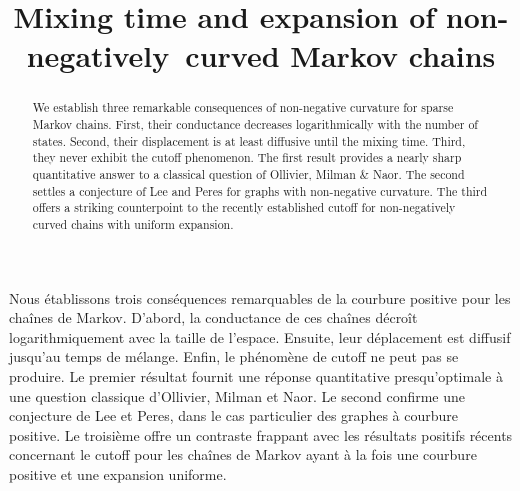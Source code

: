 \documentclass[JEP,XML,SOM,Unicode,NoEqCountersInSection,published]{cedram}
\theoremstyle{definition}
\begin{document}
\title{Mixing time and expansion of non-negatively~curved Markov chains}

\author[\initial{F.} \lastname{Münch}]{ }
\address{Max-Planck-Institut für Mathematik in den Naturwissenschaften\\
Inselstr. 22, 04103 Leipzig, Germany}

\author[\initial{J.} \lastname{Salez}]{ }
\address{Université Paris-Dauphine \& PSL, CEREMADE\\
Place du Maréchal de Lattre de Tassigny, F-75775 Paris Cedex 16, France}

\begin{abstract}
We establish three remarkable consequences of non-negative curvature for sparse Markov chains. First, their conductance decreases logarithmically with the number of states. Second, their displacement is at least diffusive until the mixing time. Third, they never exhibit the cutoff phenomenon. The first result provides a nearly sharp quantitative answer to a classical question of Ollivier, Milman \& Naor. The second settles a conjecture of Lee and Peres for graphs with non-negative curvature. The third offers a striking counterpoint to the recently established cutoff for non-negatively curved chains with uniform expansion.
\end{abstract}





\begin{altabstract}
Nous établissons trois conséquences remarquables de la courbure positive pour les chaînes de Markov. D'abord, la conductance de ces chaînes décroît logarithmiquement avec la taille de l'espace. Ensuite, leur déplacement est diffusif jusqu'au temps de mélange. Enfin, le phénomène de cutoff ne peut pas se produire. Le premier résultat fournit une réponse quantitative presqu'optimale à une question classique d'Ollivier, Milman et Naor. Le second confirme une conjecture de Lee et Peres, dans le cas particulier des graphes à courbure positive. Le troisième offre un contraste frappant avec les résultats positifs récents concernant le cutoff pour les chaînes de Markov ayant à la fois une courbure positive et une expansion uniforme.
\end{altabstract}
\maketitle
\vspace*{-\baselineskip}
\tableofcontents
\end{document}
